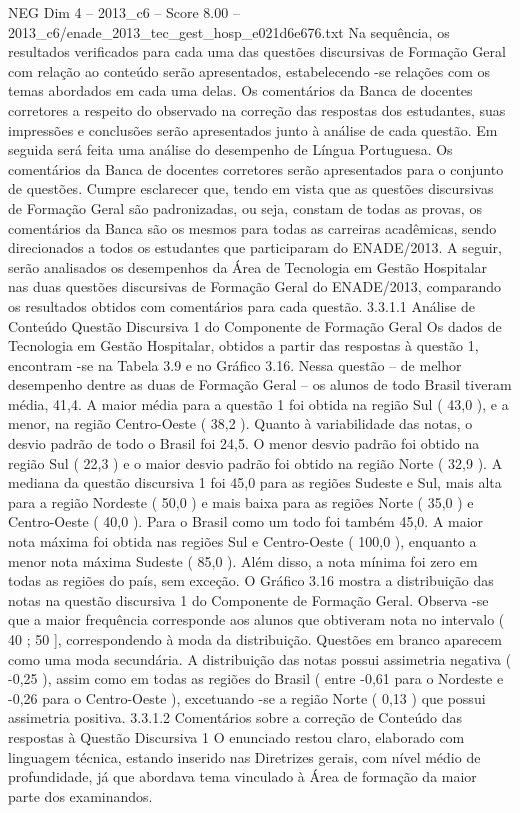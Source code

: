 \begin{textsample}{NEG Dim 4 – 2013\_c6 – Score 8.00 – 2013\_c6/enade\_2013\_tec\_gest\_hosp\_e021d6e676.txt}
Na sequência, os resultados verificados para cada uma das questões discursivas de Formação Geral com relação ao conteúdo serão apresentados, estabelecendo -se relações com os temas abordados em cada uma delas.
Os comentários da Banca de docentes corretores a respeito do observado na correção das respostas dos estudantes, suas impressões e conclusões serão apresentados junto à análise de cada questão.
Em seguida será feita uma análise do desempenho de Língua Portuguesa.
Os comentários da Banca de docentes corretores serão apresentados para o conjunto de questões.
Cumpre esclarecer que, tendo em vista que as questões discursivas de Formação Geral são padronizadas, ou seja, constam de todas as provas, os comentários da Banca são os mesmos para todas as carreiras acadêmicas, sendo direcionados a todos os estudantes que participaram do ENADE/2013.
A seguir, serão analisados os desempenhos da Área de Tecnologia em Gestão Hospitalar nas duas questões discursivas de Formação Geral do ENADE/2013, comparando os resultados obtidos com comentários para cada questão. 3.3.1.1 Análise de Conteúdo Questão Discursiva 1 do Componente de Formação Geral Os dados de Tecnologia em Gestão Hospitalar, obtidos a partir das respostas à questão 1, encontram -se na Tabela 3.9 e no Gráfico 3.16.
Nessa questão – de melhor desempenho dentre as duas de Formação Geral – os alunos de todo Brasil tiveram média, 41,4.
A maior média para a questão 1 foi obtida na região Sul ( 43,0 ), e a menor, na região Centro-Oeste ( 38,2 ).
Quanto à variabilidade das notas, o desvio padrão de todo o Brasil foi 24,5.
O menor desvio padrão foi obtido na região Sul ( 22,3 ) e o maior desvio padrão foi obtido na região Norte ( 32,9 ).
A mediana da questão discursiva 1 foi 45,0 para as regiões Sudeste e Sul, mais alta para a região Nordeste ( 50,0 ) e mais baixa para as regiões Norte ( 35,0 ) e Centro-Oeste ( 40,0 ).
Para o Brasil como um todo foi também 45,0.
A maior nota máxima foi obtida nas regiões Sul e Centro-Oeste ( 100,0 ), enquanto a menor nota máxima Sudeste ( 85,0 ).
Além disso, a nota mínima foi zero em todas as regiões do país, sem exceção.
O Gráfico 3.16 mostra a distribuição das notas na questão discursiva 1 do Componente de Formação Geral.
Observa -se que a maior frequência corresponde aos alunos que obtiveram nota no intervalo ( 40 ; 50 ], correspondendo à moda da distribuição.
Questões em branco aparecem como uma moda secundária.
A distribuição das notas possui assimetria negativa ( -0,25 ), assim como em todas as regiões do Brasil ( entre -0,61 para o Nordeste e -0,26 para o Centro-Oeste ), excetuando -se a região Norte ( 0,13 ) que possui assimetria positiva. 3.3.1.2 Comentários sobre a correção de Conteúdo das respostas à Questão Discursiva 1 O enunciado restou claro, elaborado com linguagem técnica, estando inserido nas Diretrizes gerais, com nível médio de profundidade, já que abordava tema vinculado à Área de formação da maior parte dos examinandos.

\end{textsample}
